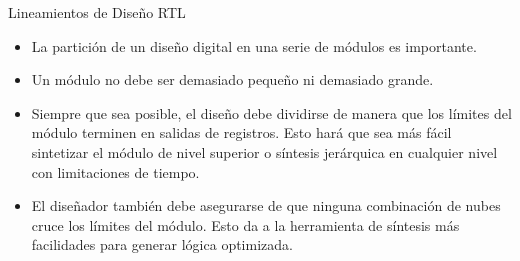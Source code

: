 \documentclass[11pt]{beamer}
\begin{document}
	\begin{frame}{Lineamientos de Diseño RTL}
	\begin{itemize}
		\item La partición de un diseño digital en una serie de módulos es importante.
		\item Un módulo no debe ser demasiado pequeño ni demasiado grande.
		\item Siempre que sea posible, el diseño debe dividirse de manera que los límites del módulo terminen en salidas de registros. Esto hará que sea más fácil sintetizar el módulo de nivel superior o síntesis jerárquica en cualquier nivel con limitaciones de tiempo.
		\item El diseñador también debe asegurarse de que ninguna combinación de nubes cruce los límites del módulo. Esto da a la herramienta de síntesis más facilidades para generar lógica optimizada.
	\end{itemize}
	\end{frame}
	
\end{document}
